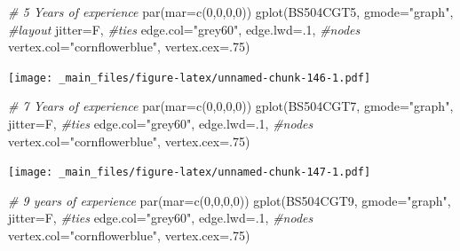\documentclass[
  notitlepage,
  onecolumn,
  openany]{book}
\newenvironment{Shaded}{\begin{snugshade}}{\end{snugshade}}
\newcommand{\AttributeTok}[1]{\textcolor[rgb]{0.77,0.63,0.00}{#1}}
\newcommand{\CommentTok}[1]{\textcolor[rgb]{0.56,0.35,0.01}{\textit{#1}}}
\newcommand{\DecValTok}[1]{\textcolor[rgb]{0.00,0.00,0.81}{#1}}
\newcommand{\FunctionTok}[1]{\textcolor[rgb]{0.00,0.00,0.00}{#1}}
\newcommand{\NormalTok}[1]{#1}
\newcommand{\StringTok}[1]{\textcolor[rgb]{0.31,0.60,0.02}{#1}}
\begin{document}
\begin{Shaded}
\begin{Highlighting}[]
\CommentTok{\# 5 Years of experience}
\FunctionTok{par}\NormalTok{(}\AttributeTok{mar=}\FunctionTok{c}\NormalTok{(}\DecValTok{0}\NormalTok{,}\DecValTok{0}\NormalTok{,}\DecValTok{0}\NormalTok{,}\DecValTok{0}\NormalTok{))}
\FunctionTok{gplot}\NormalTok{(BS504CGT5,}
      \AttributeTok{gmode=}\StringTok{"graph"}\NormalTok{,}
      \CommentTok{\#layout}
      \AttributeTok{jitter=}\NormalTok{F,}
      \CommentTok{\#ties}
      \AttributeTok{edge.col=}\StringTok{"grey60"}\NormalTok{, }
      \AttributeTok{edge.lwd=}\NormalTok{.}\DecValTok{1}\NormalTok{,}
      \CommentTok{\#nodes}
      \AttributeTok{vertex.col=}\StringTok{"cornflowerblue"}\NormalTok{,}
      \AttributeTok{vertex.cex=}\NormalTok{.}\DecValTok{75}\NormalTok{)}
\end{Highlighting}
\end{Shaded}

\texttt{[image: \_main\_files/figure-latex/unnamed-chunk-146-1.pdf]}

\begin{Shaded}
\begin{Highlighting}[]
\CommentTok{\# 7 Years of experience}
\FunctionTok{par}\NormalTok{(}\AttributeTok{mar=}\FunctionTok{c}\NormalTok{(}\DecValTok{0}\NormalTok{,}\DecValTok{0}\NormalTok{,}\DecValTok{0}\NormalTok{,}\DecValTok{0}\NormalTok{))}
\FunctionTok{gplot}\NormalTok{(BS504CGT7,}
      \AttributeTok{gmode=}\StringTok{"graph"}\NormalTok{,}
      \AttributeTok{jitter=}\NormalTok{F,}
      \CommentTok{\#ties}
      \AttributeTok{edge.col=}\StringTok{"grey60"}\NormalTok{, }
      \AttributeTok{edge.lwd=}\NormalTok{.}\DecValTok{1}\NormalTok{,}
      \CommentTok{\#nodes}
      \AttributeTok{vertex.col=}\StringTok{"cornflowerblue"}\NormalTok{,}
      \AttributeTok{vertex.cex=}\NormalTok{.}\DecValTok{75}\NormalTok{)}
\end{Highlighting}
\end{Shaded}

\texttt{[image: \_main\_files/figure-latex/unnamed-chunk-147-1.pdf]}

\begin{Shaded}
\begin{Highlighting}[]
\CommentTok{\# 9 years of experience}
\FunctionTok{par}\NormalTok{(}\AttributeTok{mar=}\FunctionTok{c}\NormalTok{(}\DecValTok{0}\NormalTok{,}\DecValTok{0}\NormalTok{,}\DecValTok{0}\NormalTok{,}\DecValTok{0}\NormalTok{))}
\FunctionTok{gplot}\NormalTok{(BS504CGT9,}
      \AttributeTok{gmode=}\StringTok{"graph"}\NormalTok{,}
      \AttributeTok{jitter=}\NormalTok{F,}
      \CommentTok{\#ties}
      \AttributeTok{edge.col=}\StringTok{"grey60"}\NormalTok{, }
      \AttributeTok{edge.lwd=}\NormalTok{.}\DecValTok{1}\NormalTok{,}
      \CommentTok{\#nodes}
      \AttributeTok{vertex.col=}\StringTok{"cornflowerblue"}\NormalTok{,}
      \AttributeTok{vertex.cex=}\NormalTok{.}\DecValTok{75}\NormalTok{)}
\end{Highlighting}
\end{Shaded}
\end{document}
